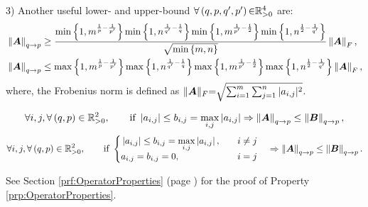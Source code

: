 \begin{property}
\begin{itemize}
3) Another useful lower- and upper-bound $\forall \left( q , p , q' , p' \right) {\in} \mathbb{R}^4_{>0}$ are:
\begin{gather*}
\begin{aligned}
&\left\lVert\boldsymbol{A}\right\rVert_{q \to p} \geq \frac{\min \left\lbrace 1 , m^{\frac1p - \frac{1}{p'}} \right\rbrace \min \left\lbrace 1 , n^{\frac{1}{q'} - \frac1q} \right\rbrace \min \left\lbrace 1 , m^{\frac{1}{p'} -\frac12} \right\rbrace \min \left\lbrace 1 , n^{\frac{1}{2} - \frac{1}{q'}} \right\rbrace}{\sqrt{\min \left\lbrace m , n \right\rbrace}} \left\lVert\boldsymbol{A}\right\rVert_F, \\
&\left\lVert\boldsymbol{A}\right\rVert_{q \to p} \leq \max \left\lbrace 1 , m^{\frac1p - \frac{1}{p'}} \right\rbrace \max \left\lbrace 1 , n^{\frac{1}{q'} - \frac1q} \right\rbrace \max \left\lbrace 1 , m^{\frac{1}{p'} - \frac12} \right\rbrace \max \left\lbrace 1 , n^{\frac12 - \frac{1}{q'}} \right\rbrace \left\lVert\boldsymbol{A}\right\rVert_F,
\end{aligned}
\end{gather*}
where, the Frobenius norm is defined as $\Vert \boldsymbol{A} \Vert_F {=} \sqrt{\sum_{i=1}^m \sum_{j=1}^n \vert a_{i,j} \vert^2}$.

\begin{gather*}
\forall i , j, \forall \left( q , p \right) \in \mathbb{R}^2_{>0}, \qquad \textrm{if } \left\lvert a_{i,j}\right\rvert \leq b_{i,j} = \max_{i,j} \left\lvert a_{i,j}\right\rvert \Rightarrow \left\lVert\boldsymbol{A}\right\rVert_{q \to p} \leq \left\lVert\boldsymbol{B}\right\rVert_{q \to p},
\end{gather*}
\begin{gather*}
\forall i , j, \forall \left( q , p \right) \in \mathbb{R}^2_{>0}, \qquad \textrm{if } 
\begin{cases}
\begin{aligned}
  &\left\lvert a_{i,j}\right\rvert \leq b_{i,j} = \max_{i,j} \left\lvert a_{i,j}\right\rvert, \quad &&i \neq j \\
  &a_{i,j} = b_{i,j} = 0, \quad &&i = j
\end{aligned}
\end{cases}
\Rightarrow \left\lVert\boldsymbol{A}\right\rVert_{q \to p} \leq \left\lVert\boldsymbol{B}\right\rVert_{q \to p}.
\end{gather*}
\end{itemize}
\end{property}
See Section \ref{prf:OperatorProperties} (page \pageref{prf:OperatorProperties}) for the proof of Property \ref{prp:OperatorProperties}.